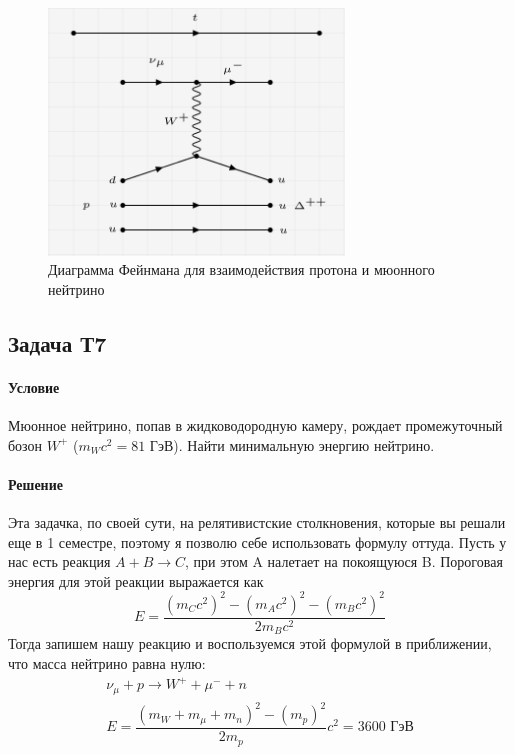 \documentclass[12pt]{article}
\begin{document}
\begin{figure}[h]
    \centering
    \includegraphics[width=0.7\textwidth,height=\textheight,keepaspectratio]{Seminar_11-12/pics/pic_06_task_10_73.PNG}
    \caption{Диаграмма Фейнмана для взаимодействия протона и мюонного нейтрино}
    \label{fig:sem_11_10_73}
\end{figure}


\subsection{Задача Т7}
\label{task_T7}
\paragraph{Условие}
Мюонное нейтрино, попав в жидководородную камеру, рождает промежуточный бозон $W^+$ ($m_Wc^2 = 81$ ГэВ). Найти минимальную энергию нейтрино.
\paragraph{Решение}
Эта задачка, по своей сути, на релятивистские столкновения, которые вы решали еще в 1 семестре, поэтому я позволю себе использовать формулу оттуда. Пусть у нас есть реакция $A + B \rightarrow C$, при этом A налетает на покоящуюся B. Пороговая энергия для этой реакции выражается как 
\begin{equation*}
    E=\dfrac{(m_Cc^2)^2 - (m_Ac^2)^2 - (m_Bc^2)^2}{2m_Bc^2}
\end{equation*}
Тогда запишем нашу реакцию и воспользуемся этой формулой в приближении, что масса нейтрино равна нулю:
\begin{gather*}
    \nu_{\mu} + p \rightarrow W^+ + \mu^- + n\\
    E = \dfrac{(m_W + m_{\mu} + m_n)^2 - (m_p)^2}{2m_p} c^2 = 3600 \text{ ГэВ}
\end{gather*}
\end{document}
